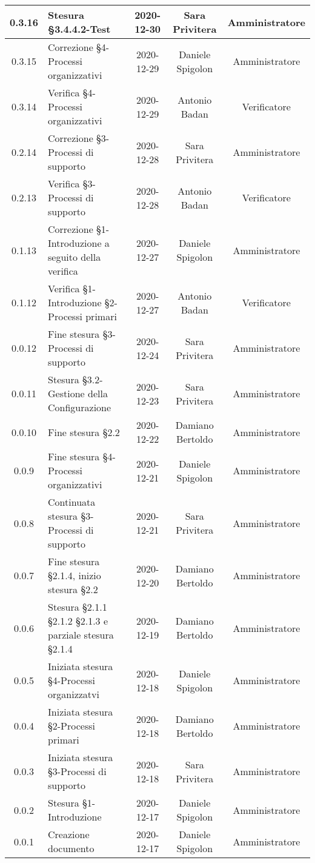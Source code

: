 \begin{center}
\begin{longtable}{|c|p{5cm}|c|c|c|}
	\hline
	0.3.16 & Stesura §3.4.4.2-Test  & 2020-12-30 & Sara Privitera & Amministratore \\
	\hline
	0.3.15 & Correzione §4-Processi organizzativi  & 2020-12-29 & Daniele Spigolon & Amministratore \\
	\hline
	0.3.14 & Verifica §4-Processi organizzativi  & 2020-12-29 & Antonio Badan & Verificatore \\
	\hline
	0.2.14 & Correzione §3-Processi di supporto  & 2020-12-28 & Sara Privitera & Amministratore \\
	\hline
	0.2.13 & Verifica §3-Processi di supporto  & 2020-12-28 & Antonio Badan & Verificatore \\
	\hline
	0.1.13 & Correzione §1-Introduzione a seguito della verifica  & 2020-12-27 & Daniele Spigolon & Amministratore \\
	\hline
	0.1.12 & Verifica §1-Introduzione §2-Processi primari  & 2020-12-27 & Antonio Badan & Verificatore \\
	\hline
	0.0.12 & Fine stesura §3-Processi di supporto & 2020-12-24 & Sara Privitera & Amministratore \\
	\hline
	0.0.11 & Stesura §3.2-Gestione della Configurazione & 2020-12-23 & Sara Privitera & Amministratore \\
	\hline
	0.0.10 & Fine stesura §2.2 & 2020-12-22 & Damiano Bertoldo & Amministratore \\
	\hline
	0.0.9 & Fine stesura §4-Processi organizzativi & 2020-12-21 & Daniele Spigolon & Amministratore \\
	\hline
	0.0.8 & Continuata stesura §3-Processi di supporto & 2020-12-21 & Sara Privitera & Amministratore \\
	\hline
	0.0.7 & Fine stesura §2.1.4, inizio stesura §2.2 & 2020-12-20 & Damiano Bertoldo & Amministratore \\
	\hline
	0.0.6 & Stesura §2.1.1 §2.1.2 §2.1.3 e parziale stesura §2.1.4 & 2020-12-19 & Damiano Bertoldo & Amministratore \\
	\hline
	0.0.5 & Iniziata stesura §4-Processi organizzatvi & 2020-12-18 & Daniele Spigolon & Amministratore \\
	\hline
	0.0.4 & Iniziata stesura §2-Processi primari & 2020-12-18 & Damiano Bertoldo & Amministratore \\
	\hline
	0.0.3 & Iniziata stesura §3-Processi di supporto & 2020-12-18 & Sara Privitera & Amministratore \\
	\hline
	0.0.2 & Stesura §1-Introduzione & 2020-12-17 & Daniele Spigolon & Amministratore \\
	\hline
	0.0.1 & Creazione documento & 2020-12-17 & Daniele Spigolon & Amministratore \\
	\hline
	
	

	\end{longtable}
\end{center}
